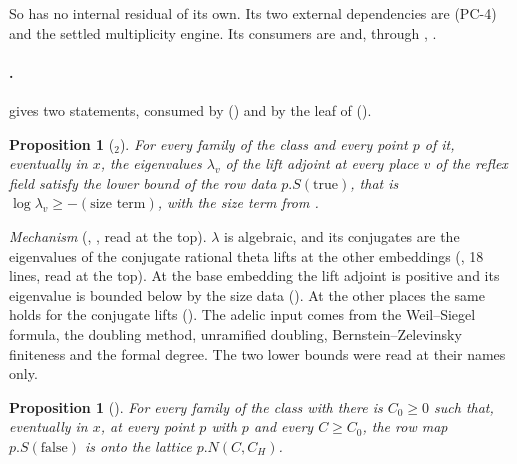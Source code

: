 \documentclass[11pt]{article}
\newcommand{\PC}[1]{\textsf{PC-#1}}
\newtheorem{proposition}[theorem]{Proposition}
\theoremstyle{remark}
\begin{document}
\noindent So  has no internal residual of its own. Its two external dependencies are  (\PC{4}) and the settled multiplicity engine. Its consumers are  and, through , .

\paragraph{.}  gives two statements, consumed by  () and by the leaf  of  ().

\begin{proposition}[$_2$]\label{prop:lamlow}
For every family of the class and every point $p$ of it, eventually in $x$, the eigenvalues $\lambda_v$ of the lift adjoint at every place $v$ of the reflex field satisfy the lower bound  of the row data $p.S(\mathrm{true})$, that is $\log\lambda_v\ge-(\text{size term})$, with the size term from .
\end{proposition}

\noindent\emph{Mechanism} (, , read at the top). $\lambda$ is algebraic, and its conjugates are the eigenvalues of the conjugate rational theta lifts at the other embeddings (, 18 lines, read at the top). At the base embedding the lift adjoint is positive and its eigenvalue is bounded below by the size data (). At the other places the same holds for the conjugate lifts (). The adelic input  comes from the Weil--Siegel formula, the doubling method, unramified doubling, Bernstein--Zelevinsky finiteness and the formal degree. The two lower bounds were read at their names only.

\begin{proposition}[]\label{prop:ontox}
For every family of the class with  there is $C_0\ge0$ such that, eventually in $x$, at every point $p$ with  $p$ and every $C\ge C_0$, the row map $p.S(\mathrm{false})$ is onto the lattice $p.N(C,C_H)$.
\end{proposition}
\end{document}
